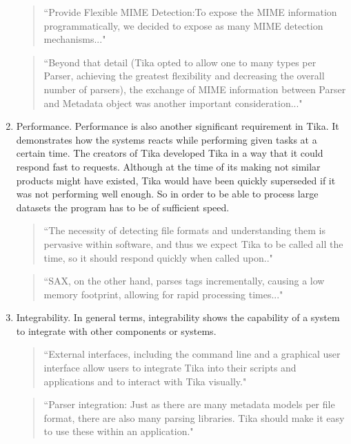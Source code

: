 \documentclass{article}
\begin{document}
\begin{enumerate}
    \begin{quote}
        ``Provide Flexible MIME Detection:To expose the MIME information programmatically, we decided to expose as many MIME detection mechanisms..."
    \end{quote}
    
    \begin{quote}
        ``Beyond that detail (Tika opted to allow one to many types per Parser, achieving the greatest flexibility and decreasing the overall number of parsers), the exchange of MIME information between Parser and Metadata object was another important consideration..."
    \end{quote}
    \item Performance. Performance is also another significant requirement in Tika. It demonstrates how the systems reacts while performing given tasks at a certain time. The creators of Tika developed Tika in a way that it could respond fast to requests. Although at the time of its making not similar products might have existed, Tika would have been quickly superseded if it was not performing well enough. So in order to be able to process large datasets the program has to be of sufficient speed.
    
    \begin{quote}
        ``The necessity of detecting file formats and understanding them is pervasive within software, and thus we expect Tika to be called all the time, so it should respond quickly when called upon.."
    \end{quote}
    
    \begin{quote}
        ``SAX, on the other hand, parses tags incrementally, causing a low memory footprint, allowing for rapid processing times..."     \end{quote}
    
    \item Integrability. In general terms, integrability shows the capability of a system to integrate with other components or systems. 
    
    \begin{quote}
        ``External interfaces, including the command line and a graphical user interface allow users to integrate Tika into their scripts and applications and to interact with Tika visually."
    \end{quote}
    
    \begin{quote}
        ``Parser integration: Just as there are many metadata models per file format, there are also many parsing libraries. Tika should make it easy to use these within an application."
    \end{quote}
    
\end{enumerate}
\end{document}
